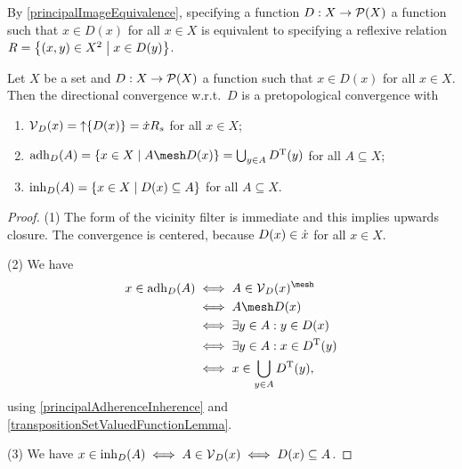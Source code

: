 By \ref{principalImageEquivalence}, specifying a function $D: X\to \operatorname{\mathcal{P}}(X)$ a function such that $x\in D(x)$ for all $x\in X$ is equivalent to specifying a reflexive relation $R = \setbuilder{(x,y)\in X^2}{x\in D(y)}$.

\begin{lemma} \label{directionalConvergenceLemma}
Let $X$ be a set and $D: X\to \operatorname{\mathcal{P}}(X)$ a function such that $x\in D(x)$ for all $x\in X$. Then the directional convergence w.r.t.\ $D$ is a pretopological convergence with
\begin{enumerate}
\item $\operatorname{\mathcal{V}}_D(x) = \operatorname{\uparrow} \{D(x)\} = \dot{x}R_s$ for all $x\in X$;
\item $\adh_D(A) = \setbuilder{x\in X}{A\mesh D(x)} = \bigcup_{y\in A}D^\transp(y)$ for all $A\subseteq X$;
\item $\inh_D(A) = \setbuilder{x\in X}{D(x)\subseteq A}$ for all $A\subseteq X$.
\end{enumerate}
\end{lemma}
\begin{proof}
(1) The form of the vicinity filter is immediate and this implies upwards closure. The convergence is centered, because $D(x)\in \dot{x}$ for all $x\in X$.

(2) We have
\begin{align*}
x\in \adh_D(A) &\iff A\in \vicinities_D(x)^\mesh \\
&\iff A\mesh D(x) \\
&\iff \exists y\in A: y \in D(x) \\
&\iff \exists y\in A: x \in D^\transp(y) \\
&\iff x\in \bigcup_{y\in A}D^\transp(y),
\end{align*}
using \ref{principalAdherenceInherence} and \ref{transpositionSetValuedFunctionLemma}.

(3) We have $x\in \operatorname{inh}_D(A) \iff A\in \operatorname{\mathcal{V}}_D(x) \iff D(x)\subseteq A$.
\end{proof}

